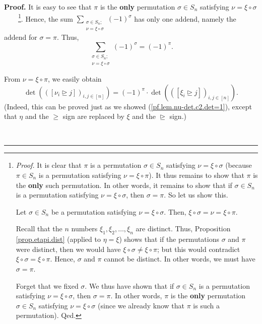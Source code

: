 \documentclass
[numbers=enddot,12pt,final,onecolumn,notitlepage,english]{scrartcl}%
\theoremstyle{definition}
\newenvironment{proof}[1][Proof]{\noindent\textbf{#1.} }{\ \rule{0.5em}{0.5em}}
\let\sumnonlimits\sum
\renewcommand{\sum}{\sumnonlimits\limits}
\newenvironment{verlong}{}{}
\newenvironment{vershort}{}{}
\begin{document}
\begin{proof}
\begin{verlong}
It is easy to see that $\pi$ is the \textbf{only} permutation $\sigma\in
S_{n}$ satisfying $\nu=\xi\circ\sigma$\ \ \ \ \footnote{\textit{Proof.} It is
clear that $\pi$ is a permutation $\sigma\in S_{n}$ satisfying $\nu=\xi
\circ\sigma$ (because $\pi\in S_{n}$ is a permutation satisfying $\nu=\xi
\circ\pi$). It thus remains to show that $\pi$ is the \textbf{only} such
permutation. In other words, it remains to show that if $\sigma\in S_{n}$ is a
permutation satisfying $\nu=\xi\circ\sigma$, then $\sigma=\pi$. So let us show
this.
\par
Let $\sigma\in S_{n}$ be a permutation satisfying $\nu=\xi\circ\sigma$. Then,
$\xi\circ\sigma=\nu=\xi\circ\pi$.
\par
Recall that the $n$ numbers $\xi_{1},\xi_{2},\ldots,\xi_{n}$ are distinct.
Thus, Proposition \ref{prop.etapi.dist} (applied to $\eta=\xi$) shows that if
the permutations $\sigma$ and $\pi$ were distinct, then we would have
$\xi\circ\sigma\neq\xi\circ\pi$; but this would contradict $\xi\circ\sigma
=\xi\circ\pi$. Hence, $\sigma$ and $\pi$ cannot be distinct. In other words,
we must have $\sigma=\pi$.
\par
Forget that we fixed $\sigma$. We thus have shown that if $\sigma\in S_{n}$ is
a permutation satisfying $\nu=\xi\circ\sigma$, then $\sigma=\pi$. In other
words, $\pi$ is the \textbf{only} permutation $\sigma\in S_{n}$ satisfying
$\nu=\xi\circ\sigma$ (since we already know that $\pi$ is such a permutation).
Qed.}. Hence, the sum $\sum_{\substack{\sigma\in S_{n};\\\nu=\xi\circ\sigma
}}\left(  -1\right)  ^{\sigma}$ has only one addend, namely the addend for
$\sigma=\pi$. Thus,
\begin{equation}
\sum_{\substack{\sigma\in S_{n};\\\nu=\xi\circ\sigma}}\left(  -1\right)
^{\sigma}=\left(  -1\right)  ^{\pi}. \label{pf.lem.xi-det.c3.sum=}%
\end{equation}

\end{verlong}

\begin{vershort}
From $\nu=\xi\circ\pi$, we easily obtain%
\begin{equation}
\det\left(  \left(  \left[  \nu_{i}\trianglerighteq j\right]  \right)
_{i,j\in\left[  n\right]  }\right)  =\left(  -1\right)  ^{\pi}\cdot\det\left(
\left(  \left[  \xi_{i}\trianglerighteq j\right]  \right)  _{i,j\in\left[
n\right]  }\right)  . \label{pf.lem.xi-det.short.c3.det=1}%
\end{equation}
(Indeed, this can be proved just as we showed (\ref{pf.lem.nu-det.c2.det=1}),
except that $\eta$ and the $\geq$ sign are replaced by $\xi$ and the
$\trianglerighteq$ sign.)
\end{vershort}


\end{proof}
\end{document}
